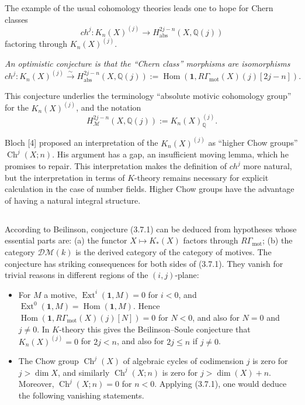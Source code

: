 \documentclass[11pt,a4paper]{article}
\theoremstyle{plain}
\theoremstyle{definition}
\DeclareMathOperator{\Ext}{Ext}
\DeclareMathOperator{\Hom}{Hom}
\DeclareMathOperator{\Ch}{Ch}
\newcommand{\Q}{\mathbb{Q}}
\DeclareMathOperator{\mot}{mot}
\newcommand{\abs}{\mathrm{abs}}
\begin{document}
The example of the usual cohomology theories leads one to hope for Chern classes
$$
ch^j:K_n(X)^{(j)}\to H^{2j-n}_{\abs}(X,\Q(j))
$$
factoring through $K_n(X)^{(j)}$.

\textit{An optimistic conjecture is that the ``Chern class'' morphisms are isomorphisms}
\begin{equation}
\tag{3.7.1}
ch^j:K_n(X)^{(j)}\xrightarrow{\sim}H^{2j-n}_{\abs}(X,\Q(j)):=\Hom(\mathbf{1},R\Gamma_{\mot}(X)(j)[2j-n]).
\end{equation}

This conjecture underlies the terminology ``absolute motivic cohomology group'' for the $K_n(X)^{(j)}$, and the notation
$$
H^{2j-n}_{\mathcal{M}}(X,\Q(j)):=K_n(X)^{(j)}_{\Q}.
$$

Bloch [4] proposed an interpretation of the $K_n(X)^{(j)}$ as ``higher Chow groups'' $\Ch^j(X;n)$. His argument has a gap, an insufficient moving lemma, which he promises to repair. This interpretation makes the definition of $ch^j$ more natural, but the interpretation in terms of $K$-theory remains necessary for explicit calculation in the case of number fields. Higher Chow groups have the advantage of having a natural integral structure.

\subsection{}

According to Beilinson, conjecture (3.7.1) can be deduced from hypotheses whose essential parts are: (a) the functor $X\mapsto K_*(X)$ factors through $R\Gamma_{\mot}$; (b) the category $\mathscr{D}\mathcal{M}(k)$ is the derived category of the category of motives. The conjecture has striking consequences for both sides of (3.7.1). They vanish for trivial reasons in different regions of the $(i,j)$-plane:
\begin{itemize}
\item[(a)] For $M$ a motive, $\Ext^i(\mathbf{1},M)=0$ for $i<0$, and $\Ext^0(\mathbf{1},M)=\Hom(\mathbf{1},M)$. Hence $\Hom(\mathbf{1},R\Gamma_{\mot}(X)(j)[N])=0$ for $N<0$, and also for $N=0$ and $j\neq0$. In $K$-theory this gives the Beilinson--Soule conjecture that $K_n(X)^{(j)}=0$ for $2j<n$, and also for $2j\leq n$ if $j\neq0$.

\item[(b)] The Chow group $\Ch^j(X)$ of algebraic cycles of codimension $j$ is zero for $j>\dim X$, and similarly $\Ch^j(X;n)$ is zero for $j>\dim(X)+n$. Moreover, $\Ch^j(X;n)=0$ for $n<0$. Applying (3.7.1), one would deduce the following vanishing statements.
\end{itemize}
\end{document}
